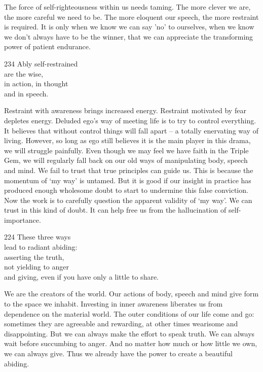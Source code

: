 \begin{dhpRefl}
  The force of self-righteousness within us needs taming. The more clever we
  are, the more careful we need to be. The more eloquent our speech, the more
  restraint is required. It is only when we know we can say 'no' to ourselves,
  when we know we don't always have to be the winner, that we can appreciate the
  transforming power of patient endurance.
\end{dhpRefl}


\begin{dhpVerse}{234}
\label{dhp-234}
Ably self-restrained\\
are the wise,\\
in action, in thought\\
and in speech.
\end{dhpVerse}

\begin{dhpRefl}
  Restraint with awareness brings increased energy. Restraint motivated by fear
  depletes energy. Deluded ego’s way of meeting life is to try to control
  everything. It believes that without control things will fall apart -- a
  totally enervating way of living. However, so long as ego still believes it is
  the main player in this drama, we will struggle painfully. Even though we may
  feel we have faith in the Triple Gem, we will regularly fall back on our old
  ways of manipulating body, speech and mind. We fail to trust that true
  principles can guide us. This is because the momentum of ‘my way’ is untamed.
  But it is good if our insight in practice has produced enough wholesome doubt
  to start to undermine this false conviction. Now the work is to carefully
  question the apparent validity of ‘my way’. We can trust in this kind of
  doubt. It can help free us from the hallucination of self-importance.
\end{dhpRefl}


\begin{dhpVerse}{224}
\label{dhp-224}
These three ways\\
lead to radiant abiding:\\
asserting the truth,\\
not yielding to anger\\
and giving, even if you have only a little to share.
\end{dhpVerse}

\begin{dhpRefl}
  We are the creators of the world. Our actions of body, speech and mind give
  form to the space we inhabit. Investing in inner awareness liberates us from
  dependence on the material world. The outer conditions of our life come and
  go: sometimes they are agreeable and rewarding, at other times wearisome and
  disappointing. But we can always make the effort to speak truth. We can always
  wait before succumbing to anger. And no matter how much or how little we own,
  we can always give. Thus we already have the power to create a beautiful
  abiding.
\end{dhpRefl}

